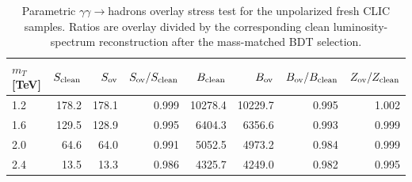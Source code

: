 \begin{table}[t]
\centering
\caption{Parametric $\gamma\gamma\to$hadrons overlay stress test for the
unpolarized fresh CLIC samples.  Ratios are overlay divided by the corresponding
clean luminosity-spectrum reconstruction after the mass-matched BDT selection.}
\label{tab:fresh-clic-overlay}
\small
\begin{tabular}{lrrrrrrr}
\toprule
$m_T$ [TeV] & $S_{\rm clean}$ & $S_{\rm ov}$ & $S_{\rm ov}/S_{\rm clean}$
& $B_{\rm clean}$ & $B_{\rm ov}$ & $B_{\rm ov}/B_{\rm clean}$ & $Z_{\rm ov}/Z_{\rm clean}$ \\
\midrule
    1.2 & 178.2 & 178.1 & 0.999 & 10278.4 & 10229.7 & 0.995 & 1.002 \\
    1.6 & 129.5 & 128.9 & 0.995 & 6404.3 & 6356.6 & 0.993 & 0.999 \\
    2.0 & 64.6 & 64.0 & 0.991 & 5052.5 & 4973.2 & 0.984 & 0.999 \\
    2.4 & 13.5 & 13.3 & 0.986 & 4325.7 & 4249.0 & 0.982 & 0.995 \\
\bottomrule
\end{tabular}
\end{table}
